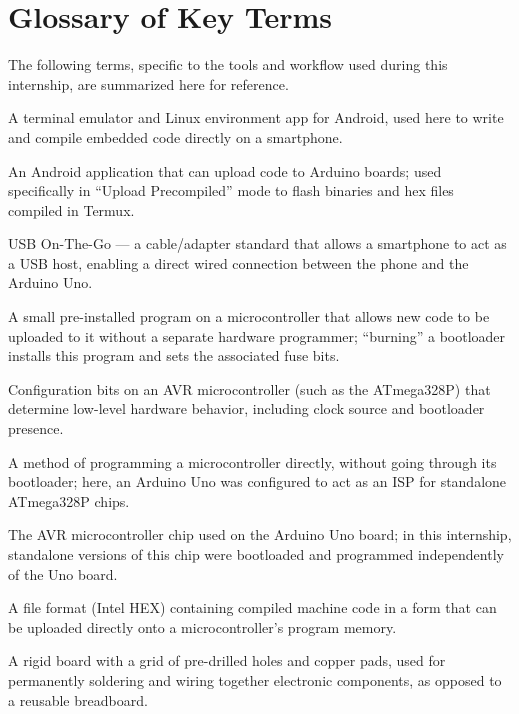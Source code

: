 \documentclass[12pt,a4paper]{report}
\begin{document}
\chapter{Glossary of Key Terms}
\label{app:glossary}
The following terms, specific to the tools and workflow used during this internship, are summarized here for reference.
\begin{description}[style=nextline,leftmargin=3.5cm,font=\bfseries]
    \item[Termux] A terminal emulator and Linux environment app for Android, used here to write and compile embedded code directly on a smartphone.
    \item[ArduinoDroid] An Android application that can upload code to Arduino boards; used specifically in ``Upload Precompiled'' mode to flash binaries and hex files compiled in Termux.
    \item[USB OTG] USB On-The-Go --- a cable/adapter standard that allows a smartphone to act as a USB host, enabling a direct wired connection between the phone and the Arduino Uno.
    \item[Bootloader] A small pre-installed program on a microcontroller that allows new code to be uploaded to it without a separate hardware programmer; ``burning'' a bootloader installs this program and sets the associated fuse bits.
    \item[Fuse Bits] Configuration bits on an AVR microcontroller (such as the ATmega328P) that determine low-level hardware behavior, including clock source and bootloader presence.
    \item[ISP (In-System Programmer)] A method of programming a microcontroller directly, without going through its bootloader; here, an Arduino Uno was configured to act as an ISP for standalone ATmega328P chips.
    \item[ATmega328P] The AVR microcontroller chip used on the Arduino Uno board; in this internship, standalone versions of this chip were bootloaded and programmed independently of the Uno board.
    \item[Hex File] A file format (Intel HEX) containing compiled machine code in a form that can be uploaded directly onto a microcontroller's program memory.
    \item[Perfboard] A rigid board with a grid of pre-drilled holes and copper pads, used for permanently soldering and wiring together electronic components, as opposed to a reusable breadboard.
\end{description}
\end{document}
